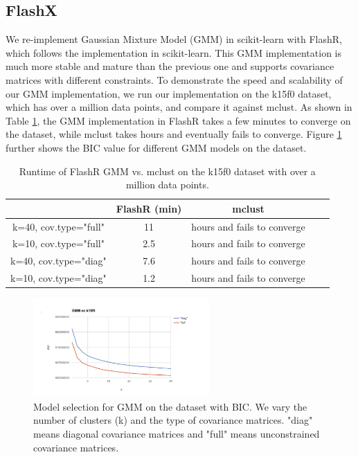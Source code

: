 \documentclass[simplex.tex]{subfiles}
\begin{document}
\subsection{FlashX}

We re-implement Gaussian Mixture Model (GMM) in scikit-learn with FlashR,
which follows
the implementation in scikit-learn. This GMM implementation is much more
stable and mature than the previous one and supports covariance matrices
with different constraints. To demonstrate the speed and scalability of
our GMM implementation, we run our implementation on the k15f0 dataset,
which has over a million data points, and compare it against mclust.
As shown in Table \ref{tbl:GMM}, the GMM implementation in FlashR takes
a few minutes to converge on the dataset, while mclust takes hours and
eventually fails to converge. Figure \ref{fig:GMM} further shows
the BIC value for different GMM models on the dataset.

\begin{table}
\begin{center}
\caption{Runtime of FlashR GMM vs. mclust on the k15f0 dataset with over
a million data points.}
\vspace{-10pt}
\footnotesize
\begin{tabular}{|c|c|c|c|c|}
\hline
& FlashR (min) & mclust \\
\hline
k=40, cov.type="full" & 11 & hours and fails to converge \\
\hline
k=10, cov.type="full" & 2.5 & hours and fails to converge \\
\hline
k=40, cov.type="diag" & 7.6 & hours and fails to converge \\
\hline
k=10, cov.type="diag" & 1.2 & hours and fails to converge \\
\hline
\end{tabular}
\normalsize
\label{tbl:GMM}
\end{center}
\vspace{-10pt}
\end{table}

\begin{figure}[!h]
\begin{cframed}
\centering
\includegraphics[width=0.6\textwidth]{../../figs/GMM.jpg}
\caption{Model selection for GMM on the dataset with BIC. We vary
the number of clusters (k) and the type of covariance matrices.
"diag" means diagonal covariance matrices and "full" means unconstrained
covariance matrices.}
\label{fig:GMM}
\end{cframed}
\end{figure}
\end{document}
